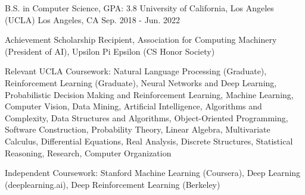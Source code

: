 

\begin{cventries}

  \cventry
    {B.S. in Computer Science, GPA: 3.8} %
    {University of California, Los Angeles (UCLA)} %
    {Los Angeles, CA} %
    {Sep. 2018 - Jun. 2022} %
    {
      \begin{cvitems} %
        \item {Achievement Scholarship Recipient, Association for Computing Machinery
        (President of AI), Upsilon Pi Epsilon (CS Honor Society)}
        \item {Relevant UCLA Coursework: Natural Language Processing (Graduate), Reinforcement Learning (Graduate),
        Neural Networks and Deep Learning, Probabilistic Decision Making and Reinforcement 
        Learning, Machine Learning, Computer Vision, Data Mining, Artificial Intelligence,
        Algorithms and Complexity, Data Structures and Algorithms, Object-Oriented 
        Programming, Software Construction, Probability Theory, Linear Algebra, 
        Multivariate Calculus, Differential Equations, Real Analysis, Discrete Structures, Statistical Reasoning, 
        Research, Computer Organization}
        \item {Independent Coursework: Stanford Machine Learning (Coursera), Deep Learning (deeplearning.ai), Deep Reinforcement Learning (Berkeley)}
      \end{cvitems}
    }

\end{cventries}

